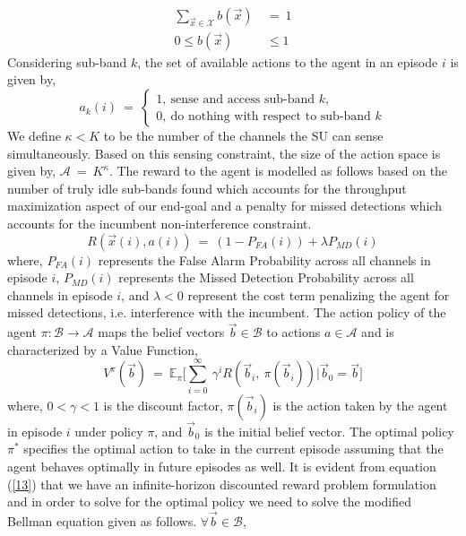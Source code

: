 \documentclass[conference]{IEEEtran}
\begin{document}
\begin{equation}\label{10}
    \begin{aligned}
        \sum_{\vec{x} \in \mathcal{X}} b(\vec{x})\ &=\ 1 \\
        0 \leq b(\vec{x}) &\leq 1
    \end{aligned}
\end{equation}
Considering sub-band $k$, the set of available actions to the agent in an episode $i$ is given by,
\begin{equation}\label{11}
    a_k(i)\ =\ 
    \begin{cases}
        1,\ \text{sense and access sub-band $k$},\\
        0,\ \text{do nothing with respect to sub-band $k$}
    \end{cases}
\end{equation}
We define $\kappa < K$ to be the number of the channels the SU can sense simultaneously. Based on this sensing constraint, the size of the action space is given by, $\mathcal{A}\ =\ K^{\kappa}$. The reward to the agent is modelled as follows based on the number of truly idle sub-bands found which accounts for the throughput maximization aspect of our end-goal and a penalty for missed detections which accounts for the incumbent non-interference constraint.
\begin{equation}\label{12}
    R(\vec{x}(i),a(i))\ =\ (1 - P_{FA}(i)) + \lambda P_{MD}(i)
\end{equation}
where, $P_{FA}(i)$ represents the False Alarm Probability across all channels in episode $i$, $P_{MD}(i)$ represents the Missed Detection Probability across all channels in episode $i$, and $\lambda < 0$ represent the cost term penalizing the agent for missed detections, i.e. interference with the incumbent. The action policy of the agent $\pi: \mathcal{B} \rightarrow \mathcal{A}$ maps the belief vectors $\vec{b} \in \mathcal{B}$ to actions $a \in \mathcal{A}$ and is characterized by a Value Function,
\begin{equation}\label{13}
    V^{\pi}(\vec{b})\ =\ \mathbb{E}_{\pi}\Big[\sum_{i=0}^{\infty}\ \gamma^i R(\vec{b}_i,\ \pi(\vec{b}_i))|\vec{b}_0=\vec{b}\Big]
\end{equation}
where, $0 < \gamma < 1$ is the discount factor, $\pi(\vec{b}_i)$ is the action taken by the agent in episode $i$ under policy $\pi$, and $\vec{b}_0$ is the initial belief vector. The optimal policy $\pi^*$ specifies the optimal action to take in the current episode assuming that the agent behaves optimally in future episodes as well. It is evident from equation (\ref{13}) that we have an infinite-horizon discounted reward problem formulation and in order to solve for the optimal policy we need to solve the modified Bellman equation given as follows. $\forall \vec{b} \in \mathcal{B}$,
\end{document}
